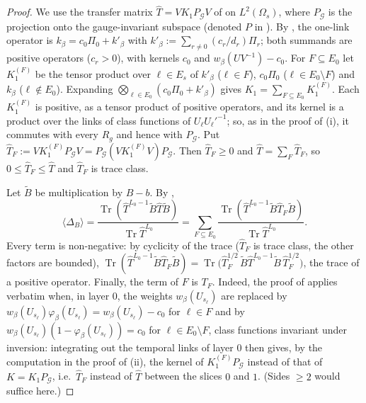 \documentclass[11pt,a4paper]{article}
\theoremstyle{definition}
\theoremstyle{remark}
\DeclareMathOperator{\Tr}{Tr}
\newcommand{\Fref}[3]{\cite[#1~`#2' (\texttt{#3})]{F}}
\newcommand{\Flab}[2]{\cite[#1 \texttt{#2}]{F}}
\begin{document}
\begin{proof}
We use the transfer matrix $\hat T=VK_1P_{\mathcal G}V$ of \Flab{Definition}{def:T} on $L^2(\Omega_s)$, where $P_{\mathcal G}$ is the
projection onto the gauge-invariant subspace (denoted $P$ in \cite{F}). By
\Fref{Lemma}{The one-link operator}{lem:kop}, the one-link operator is $k_\beta=c_0\Pi_0+k'_\beta$ with $k'_\beta:=\sum_{r\ne0}(c_r/d_r)\Pi_r$;
both summands are positive operators ($c_r>0$), with kernels $c_0$ and $w_\beta(UV^{-1})-c_0$. For $F\subseteq E_0$ let $K_1^{(F)}$ be the
tensor product over $\ell\in E_s$ of $k'_\beta$ ($\ell\in F$), $c_0\Pi_0$ ($\ell\in E_0\setminus F$) and $k_\beta$ ($\ell\notin E_0$). Expanding
$\bigotimes_{\ell\in E_0}(c_0\Pi_0+k'_\beta)$ gives $K_1=\sum_{F\subseteq E_0}K_1^{(F)}$. Each $K_1^{(F)}$ is positive, as a tensor product of
positive operators, and its kernel is a product over the links of class functions of $U_\ell U_\ell'^{-1}$; so, as in the proof of
\Flab{Lemma}{lem:K}(i), it commutes with every $R_g$ and hence with $P_{\mathcal G}$. Put $\hat T_F:=VK_1^{(F)}P_{\mathcal G}V=P_{\mathcal G}(VK_1^{(F)}V)P_{\mathcal G}$. Then $\hat T_F\ge0$ and
$\hat T=\sum_F\hat T_F$, so $0\le\hat T_F\le\hat T$ and $\hat T_F$ is trace class.

Let $\tilde B$ be multiplication by $B-b$. By \Fref{Theorem}{Transfer matrix formalism}{thm:tm},
\[
\langle\Delta_B\rangle=\frac{\Tr(\hat T^{L_0-1}\tilde B\hat T\tilde B)}{\Tr\hat T^{L_0}}=\sum_{F\subseteq E_0}\frac{\Tr(\hat T^{L_0-1}\tilde B\hat T_F\tilde B)}{\Tr\hat T^{L_0}} .
\]
Every term is non-negative: by cyclicity of the trace ($\hat T_F$ is trace class, the other factors are bounded),
$\Tr(\hat T^{L_0-1}\tilde B\hat T_F\tilde B)=\Tr\bigl(\hat T_F^{1/2}\,\tilde B\hat T^{L_0-1}\tilde B\,\hat T_F^{1/2}\bigr)$, the trace of a positive operator.
Finally, the term of $F$ is $T_F$. Indeed, the proof of \Flab{Theorem}{thm:tm} applies verbatim when, in layer $0$, the
weights $w_\beta(U_{s_\ell})$ are replaced by $w_\beta(U_{s_\ell})\varphi_\beta(U_{s_\ell})=w_\beta(U_{s_\ell})-c_0$ for $\ell\in F$ and by
$w_\beta(U_{s_\ell})(1-\varphi_\beta(U_{s_\ell}))=c_0$ for $\ell\in E_0\setminus F$, class functions invariant under inversion: integrating out the temporal links of
layer $0$ then gives, by the computation in the proof of \Flab{Lemma}{lem:K}(ii), the kernel of $K_1^{(F)}P_{\mathcal G}$ instead of that of
$K=K_1P_{\mathcal G}$, i.e.\ $\hat T_F$ instead of $\hat T$ between the slices $0$ and $1$. (Sides $\ge2$ would suffice here.)
\end{proof}
\end{document}
